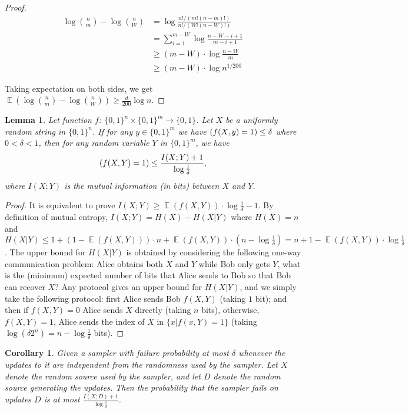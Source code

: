 \documentclass[10pt]{article}
\newtheorem{lemma}{Lemma}
\newtheorem{corollary}{Corollary}
\DeclareMathOperator*{\E}{\mathbb{E}}
\let\Pr\relax
\DeclareMathOperator*{\Pr}{\mathbb{P}}
\begin{document}
\begin{proof}
  \begin{align}
  \log {n \choose m}-\log {n \choose W}
  &= \log \frac{n!/(m!(n-m)!)}{n!/(W!(n-W)!)} \\
  &= \sum_{i=1}^{m-W}\log \frac{n-W-i+1}{m-i+1} \\
  &\ge (m-W)\cdot \log \frac{n-W}{m} \\
  &\ge (m-W)\cdot \log n^{1/200}
  \end{align}
  
  Taking expectation on both sides, we get $\E(\log {n \choose m}-\log {n \choose W})\ge \frac{d}{200} \log n$. 
\end{proof}

\begin{lemma}\label{lemma:mutual-entropy-vs-fail-prob}
  Let function $f$: $\{0,1\}^n\times \{0,1\}^m\rightarrow \{0,1\}$. Let $X$ be a uniformly random string in $\{0,1\}^n$. If for any $y\in \{0,1\}^m$ we have $\Pr(f(X,y)=1)\le \delta$ where $0<\delta<1$, then for any random variable $Y$ in $\{0,1\}^m$, we have 
  \begin{align}
    \Pr(f(X,Y)=1)\le \frac{I(X;Y)+1}{\log \frac{1}{\delta}},
  \end{align}
  where $I(X;Y)$ is the mutual information (in bits) between $X$ and $Y$.
\end{lemma}

\begin{proof}
  It is equivalent to prove $I(X;Y)\ge \E(f(X,Y))\cdot \log\frac{1}{\delta}-1$. By definition of mutual entropy, $I(X;Y)=H(X)-H(X|Y)$ where $H(X)=n$ and $H(X|Y)\le 1+(1-\E(f(X,Y)))\cdot n+\E(f(X,Y))\cdot (n-\log\frac{1}{\delta})=n+1-\E(f(X,Y))\cdot \log\frac{1}{\delta}$.
  The upper bound for $H(X|Y)$ is obtained by considering the following one-way communication problem: Alice obtains both $X$ and $Y$ while Bob only gets $Y$, what is the (minimum) expected number of bits that Alice sends to Bob so that Bob can recover $X$? 
  Any protocol gives an upper bound for $H(X|Y)$, and we simply take the following protocol: first Alice sends Bob $f(X,Y)$ (taking $1$ bit); and then if $f(X,Y)=0$ Alice sends $X$ directly (taking $n$ bits), otherwise, $f(X,Y)=1$, Alice sends the index of $X$ in $\{x|f(x,Y)=1\}$ (taking $\log (\delta 2^n)=n-\log\frac{1}{\delta}$ bits).  
\end{proof}

\begin{corollary}\label{corollary:sampler-failure}
  Given a sampler with failure probability at most $\delta$ whenever the updates to it are independent from the randomness used by the sampler. Let $X$ denote the random source used by the sampler, and let $D$ denote the random source generating the updates. Then the probability that the sampler fails on updates $D$ is at most $\frac{I(X;D)+1}{\log\frac{1}{\delta}}$.
\end{corollary}
\end{document}
